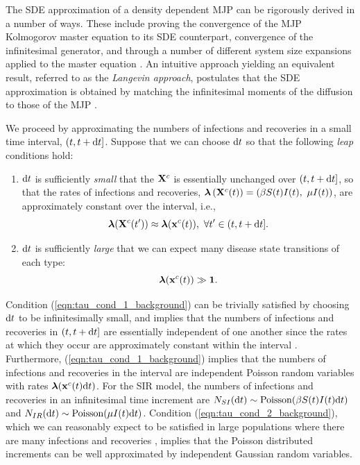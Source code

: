 The SDE approximation of a density dependent MJP can be rigorously derived in a number of ways. These include proving the convergence of the MJP Kolmogorov master equation to its SDE counterpart, convergence of the infinitesimal generator, and through a number of different system size expansions applied to the master equation \cite{fuchs2013inference}. An intuitive approach yielding an equivalent result, referred to as the \textit{Langevin approach}, postulates that the SDE approximation is obtained by matching the infinitesimal moments of the diffusion to those of the MJP \cite{fuchs2013inference,gillespie2000chemical,wallace2012linear}. 

We proceed by approximating the numbers of infections and recoveries in a small time interval, $ (t, t+\mathrm{d} t] $. Suppose that we can choose $ \mathrm{d} t $ so that the following \textit{leap} conditions hold:
\begin{enumerate}
	\item $ \mathrm{d} t $ is sufficiently \textit{small} that the $ \mathbf{X}^c $ is essentially unchanged over $ (t,t+\mathrm{d} t] $, so that the rates of infections and recoveries, $ \boldsymbol{\lambda}\left (\mathbf{X}^c(t)) = (\beta S(t)I(t),\ \mu I(t)\right ) $, are approximately constant over the interval, i.e.,  
	\begin{equation}\label{eqn:tau_cond_1_background}
	\boldsymbol{\lambda}(\mathbf{X}^c(t^\prime)) \approx \boldsymbol{\lambda}(\mathbf{x}^c(t)),\ \forall t^\prime \in (t,t+\mathrm{d} t].
	\end{equation}
	\item $ \mathrm{d} t $ is sufficiently \textit{large} that we can expect many disease state transitions of each type:
	\begin{equation}\label{eqn:tau_cond_2_background}
	\boldsymbol{\lambda}(\mathbf{x}^c(t)) \gg \boldsymbol{1}.
	\end{equation}
\end{enumerate}
Condition (\ref{eqn:tau_cond_1_background}) can be trivially satisfied by choosing $ \mathrm{d} t $ to be infinitesimally small, and implies that the numbers of infections and recoveries in $ (t,t+\mathrm{d} t] $ are essentially independent of one another since the rates at which they occur are approximately constant within the interval \cite{gillespie2000chemical}. Furthermore, (\ref{eqn:tau_cond_1_background}) implies that the numbers of infections and recoveries in the interval are independent Poisson random variables with rates $ \boldsymbol{\lambda}(\mathbf{x}^c(t)\mathrm{d} t) $. For the SIR model, the numbers of infections and recoveries in an infinitesimal time increment are $ N_{SI}(\mathrm{d} t) \sim \mathrm{Poisson}(\beta S(t)I(t)\mathrm{d} t) $ and $ N_{IR}(\mathrm{d} t) \sim \mathrm{Poisson}(\mu I(t)\mathrm{d} t) $. Condition (\ref{eqn:tau_cond_2_background}), which we can reasonably expect to be satisfied in large populations where there are many infections and recoveries \cite{wallace2012linear}, implies that the Poisson distributed increments can be well approximated by independent Gaussian random variables. 


